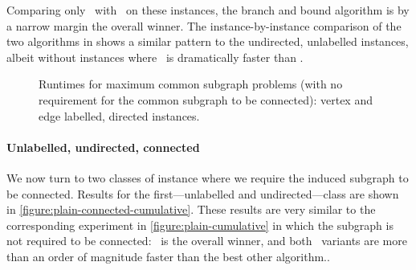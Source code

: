Comparing only \McSplit\ with \McSplitDown\ on these instances, the branch and bound
algorithm is by a narrow margin the overall winner.  The instance-by-instance
comparison of the two algorithms in  shows a similar pattern
to the undirected, unlabelled instances, albeit without instances where \McSplitDown\
is dramatically faster than \McSplit.

\begin{figure}[h!]
    \centering
    \par\bigskip
    \caption{Runtimes for maximum
    common subgraph problems (with no requirement for the common subgraph
    to be connected): vertex and edge labelled, directed instances.}\label{figure:mcs-cumulative-labelled-not-connected}
\end{figure}









\paragraph{Unlabelled, undirected, connected}
We now turn to two classes of instance where we require the induced
subgraph to be connected.
Results for the first---unlabelled and undirected---class are shown
in \cref{figure:plain-connected-cumulative}.  These results are very similar to
the corresponding experiment in \cref{figure:plain-cumulative} in which the
subgraph is not required to be connected: \McSplitDown\ is the overall winner,
and both \McSplit\ variants are more than an order of magnitude faster than
the best other algorithm..

